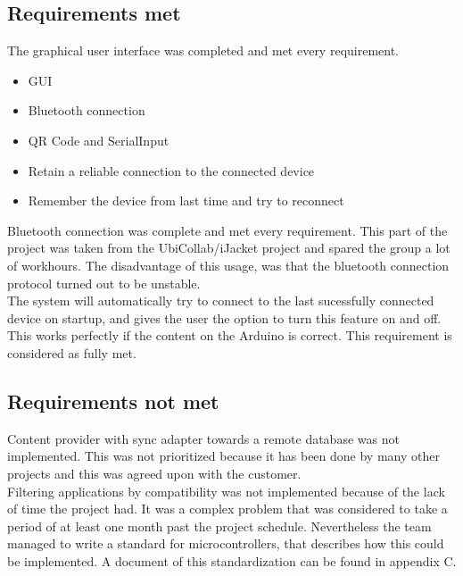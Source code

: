     	\subsection{Requirements met}
    		The graphical user interface was completed and met every requirement.\\

		\begin{itemize}
			\item{GUI}
			\item{Bluetooth connection}
			\item{QR Code and SerialInput}
			\item{Retain a reliable connection to the connected device}
			\item{Remember the device from last time and try to reconnect}
		\end{itemize}
    		Bluetooth connection was complete and met every requirement. This part of the project was taken from the UbiCollab/iJacket project and spared the group a lot of workhours. The disadvantage of this usage, was that the bluetooth connection protocol turned out to be unstable.\\

    		The system will automatically try to connect to the last sucessfully connected device on startup, and gives the user the option to turn this feature on and off. This works perfectly if the content on the Arduino is correct. This requirement is considered as fully met.\\

		\subsection{Requirements not met}
			Content provider with sync adapter towards a remote database was not implemented. This was not prioritized because it has been done by many other projects and this was agreed upon with the customer. \\

			Filtering applications by compatibility was not implemented because of the lack of time the project had. It was a complex problem that was considered to take a period of at least one month past the project schedule. Nevertheless the team managed to write a standard for microcontrollers, that describes how this could be implemented. A document of this standardization can be found in appendix C. \\
